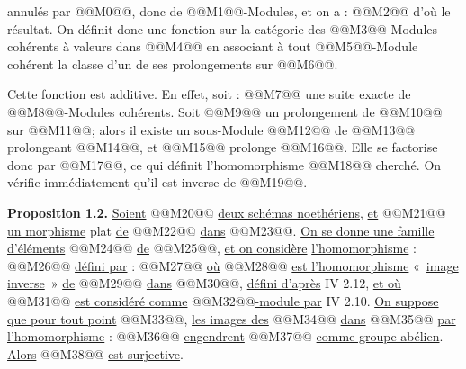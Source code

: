 
annulés par @@M0@@, donc de @@M1@@-Modules, et on a :
@@M2@@
d'où le résultat. On définit donc une fonction sur la catégorie des @@M3@@-Modules cohérents à valeurs dans @@M4@@ en associant à tout @@M5@@-Module cohérent la classe d'un de ses prolongements sur @@M6@@.

Cette fonction est additive. En effet, soit :
@@M7@@
une suite exacte de @@M8@@-Modules cohérents. Soit @@M9@@ un prolongement de @@M10@@ sur @@M11@@; alors il existe un sous-Module @@M12@@ de @@M13@@ prolongeant @@M14@@, et @@M15@@ prolonge @@M16@@. Elle se factorise donc par @@M17@@, ce qui définit l'homomorphisme @@M18@@ cherché. On vérifie immédiatement qu'il est inverse de @@M19@@.

\textbf{Proposition 1.2.} \uline{Soient} @@M20@@ \uline{deux schémas noethériens}, \uline{et} @@M21@@ \uline{un morphisme} plat \uline{de} @@M22@@ \uline{dans} @@M23@@. \uline{On se donne une famille d'éléments} @@M24@@ \uline{de} @@M25@@, \uline{et on considère} \uline{l'homomorphisme} :
@@M26@@
\uline{défini par} :
@@M27@@
\uline{où} @@M28@@ \uline{est l'homomorphisme} «~\uline{image inverse}~» \uline{de} @@M29@@ \uline{dans} @@M30@@, \uline{défini d'après} IV 2.12, \uline{et où} @@M31@@ \uline{est considéré comme} @@M32@@\uline{-module par} IV 2.10. \uline{On suppose que pour tout point} @@M33@@, \uline{les images des} @@M34@@ \uline{dans} @@M35@@ \uline{par} \uline{l'homomorphisme} :
@@M36@@
\uline{engendrent} @@M37@@ \uline{comme groupe abélien}. \uline{Alors} @@M38@@ \uline{est surjective}.

